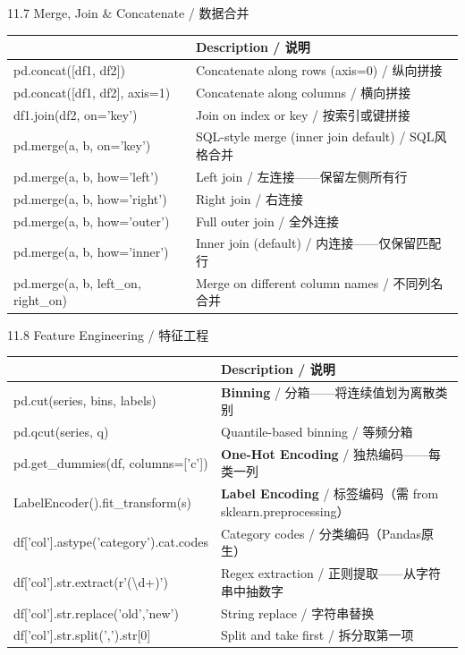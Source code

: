 \documentclass[11pt,a4paper]{report}
\begin{document}
\begin{cmdsection}{11.7  Merge, Join \& Concatenate / 数据合并}
\normalsize\renewcommand{\arraystretch}{1.4}
\centering
\begin{tabularx}{\textwidth}{@{}>{\ttfamily}l>{\raggedright\arraybackslash}X@{}}
\toprule
\multicolumn{1}{@{}l}{\textbf{Syntax}} & \textbf{Description / 说明} \\ \midrule
pd.concat([df1, df2])       & Concatenate along rows (axis=0) / 纵向拼接 \\
pd.concat([df1, df2], axis=1) & Concatenate along columns / 横向拼接 \\
df1.join(df2, on='key')     & Join on index or key / 按索引或键拼接 \\
pd.merge(a, b, on='key')    & SQL-style merge (inner join default) / SQL风格合并 \\
pd.merge(a, b, how='left')  & Left join / 左连接——保留左侧所有行 \\
pd.merge(a, b, how='right') & Right join / 右连接 \\
pd.merge(a, b, how='outer') & Full outer join / 全外连接 \\
pd.merge(a, b, how='inner') & Inner join (default) / 内连接——仅保留匹配行 \\
pd.merge(a, b, left\_on, right\_on) & Merge on different column names / 不同列名合并 \\
\bottomrule
\end{tabularx}
\end{cmdsection}

\begin{cmdsection}{11.8  Feature Engineering / 特征工程}
\normalsize\renewcommand{\arraystretch}{1.4}
\centering
\begin{tabularx}{\textwidth}{@{}>{\ttfamily}l>{\raggedright\arraybackslash}X@{}}
\toprule
\multicolumn{1}{@{}l}{\textbf{Syntax}} & \textbf{Description / 说明} \\ \midrule
pd.cut(series, bins, labels) & \textbf{Binning} / 分箱——将连续值划为离散类别 \\
pd.qcut(series, q)          & Quantile-based binning / 等频分箱 \\
pd.get\_dummies(df, columns=['c']) & \textbf{One-Hot Encoding} / 独热编码——每类一列 \\
LabelEncoder().fit\_transform(s) & \textbf{Label Encoding} / 标签编码（需 from sklearn.preprocessing） \\
df['col'].astype('category').cat.codes & Category codes / 分类编码（Pandas原生） \\
df['col'].str.extract(r'(\textbackslash d+)') & Regex extraction / 正则提取——从字符串中抽数字 \\
df['col'].str.replace('old','new') & String replace / 字符串替换 \\
df['col'].str.split(',').str[0] & Split and take first / 拆分取第一项 \\
\bottomrule
\end{tabularx}
\end{cmdsection}
\end{document}

